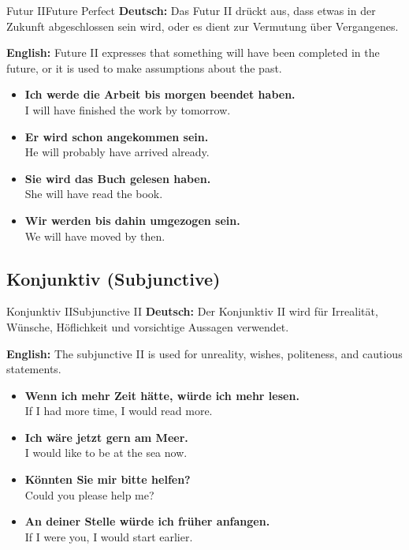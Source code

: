 \documentclass[a4paper,11pt]{article}
\newcommand{\GermanText}[1]{\textbf{Deutsch: }#1\par}
\newcommand{\EnglishText}[1]{{\color{SoftGray}\textbf{English: }#1\par}}
\newcommand{\ExampleItem}[2]{\item \textbf{#1}\\{\color{SoftGray}#2}}
\begin{document}
\begin{grammarentry}{Futur II}{Future Perfect}
    \GermanText{Das Futur II drückt aus, dass etwas in der Zukunft abgeschlossen sein wird, oder es dient zur Vermutung über Vergangenes.}
    \EnglishText{Future II expresses that something will have been completed in the future, or it is used to make assumptions about the past.}
    \begin{exbox}
        \begin{itemize}
            \ExampleItem{Ich werde die Arbeit bis morgen beendet haben.}{I will have finished the work by tomorrow.}
            \ExampleItem{Er wird schon angekommen sein.}{He will probably have arrived already.}
            \ExampleItem{Sie wird das Buch gelesen haben.}{She will have read the book.}
            \ExampleItem{Wir werden bis dahin umgezogen sein.}{We will have moved by then.}
        \end{itemize}
    \end{exbox}
\end{grammarentry}

\subsection{Konjunktiv {\small (Subjunctive)}}

\begin{grammarentry}{Konjunktiv II}{Subjunctive II}
    \GermanText{Der Konjunktiv II wird für Irrealität, Wünsche, Höflichkeit und vorsichtige Aussagen verwendet.}
    \EnglishText{The subjunctive II is used for unreality, wishes, politeness, and cautious statements.}
    \begin{exbox}
        \begin{itemize}
            \ExampleItem{Wenn ich mehr Zeit hätte, würde ich mehr lesen.}{If I had more time, I would read more.}
            \ExampleItem{Ich wäre jetzt gern am Meer.}{I would like to be at the sea now.}
            \ExampleItem{Könnten Sie mir bitte helfen?}{Could you please help me?}
            \ExampleItem{An deiner Stelle würde ich früher anfangen.}{If I were you, I would start earlier.}
        \end{itemize}
    \end{exbox}
\end{grammarentry}
\end{document}
